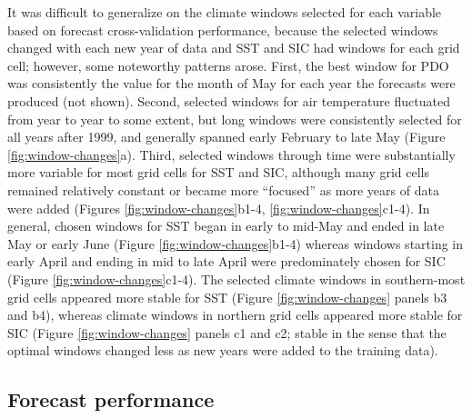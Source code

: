 \documentclass[12pt,]{book}
\theoremstyle{definition}
\theoremstyle{definition}
\theoremstyle{definition}
\theoremstyle{remark}
\begin{document}
\noindent
It was difficult to generalize on the climate windows selected for each
variable based on forecast cross-validation performance, because the
selected windows changed with each new year of data and SST and SIC had
windows for each grid cell; however, some noteworthy patterns arose.
First, the best window for PDO was consistently the value for the month
of May for each year the forecasts were produced (not shown). Second,
selected windows for air temperature fluctuated from year to year to
some extent, but long windows were consistently selected for all years
after 1999, and generally spanned early February to late May (Figure
\ref{fig:window-changes}a). Third, selected windows through time were
substantially more variable for most grid cells for SST and SIC,
although many grid cells remained relatively constant or became more
``focused'' as more years of data were added (Figures
\ref{fig:window-changes}b1-4, \ref{fig:window-changes}c1-4). In general,
chosen windows for SST began in early to mid-May and ended in late May
or early June (Figure \ref{fig:window-changes}b1-4) whereas windows
starting in early April and ending in mid to late April were
predominately chosen for SIC (Figure \ref{fig:window-changes}c1-4). The
selected climate windows in southern-most grid cells appeared more
stable for SST (Figure \ref{fig:window-changes} panels b3 and b4),
whereas climate windows in northern grid cells appeared more stable for
SIC (Figure \ref{fig:window-changes} panels c1 and c2; stable in the
sense that the optimal windows changed less as new years were added to
the training data).

\subsection{Forecast performance}\label{forecast-performance}
\end{document}
